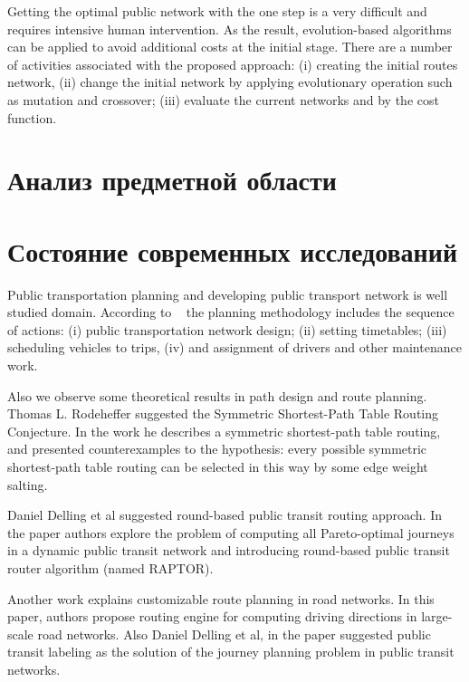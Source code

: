 Getting the optimal public network with the one step is a very difficult and requires intensive human 
intervention. As the result, evolution-based algorithms can be applied to avoid additional costs at 
the initial stage. There are a number of activities associated with the proposed approach: 
(i) creating the initial routes network, (ii) change the initial network by applying evolutionary 
operation such as mutation and crossover; (iii) evaluate the current networks and by the cost function. 

\section{Анализ предметной области}

\section{Состояние современных исследований}
Public transportation planning and developing public transport network is well studied domain. 
According to ~\cite{ceder2007} the planning methodology includes the sequence of actions: 
(i) public transportation network design; (ii) setting timetables; (iii) scheduling vehicles 
to trips, (iv) and assignment of drivers and other maintenance work. 

Also we observe some theoretical results in path design and route planning. Thomas L. Rodeheffer 
suggested the Symmetric Shortest-Path Table Routing Conjecture. In the work 
\cite{rodeheffer2013symmetric} he describes a symmetric shortest-path table routing, and presented 
counterexamples to the hypothesis: every possible symmetric shortest-path table routing can be 
selected in this way by some edge weight salting.

Daniel Delling et al suggested round-based public transit routing approach. In the paper 
\cite{delling2014round} authors explore the problem of computing all Pareto-optimal journeys in a 
dynamic public transit network and introducing round-based public transit router algorithm (named RAPTOR).

Another work \cite{delling2015customizable} explains customizable route planning in road networks. In 
this paper, authors propose routing engine for computing driving directions in large-scale road networks. 
Also Daniel Delling et al, in the paper \cite{delling2015public} suggested public transit labeling as the 
solution of the journey planning problem in public transit networks. 

